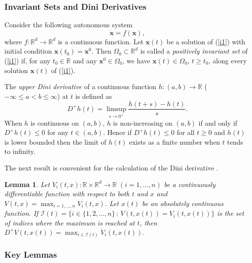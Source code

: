 \documentclass[a4paper, 11pt]{article}
\newtheorem{lemma}{Lemma}
\begin{document}
\subsubsection{Invariant Sets and Dini Derivatives}
Consider the following
autonomous system
\begin{equation}
\label{i1} \dot{\mathbf{x}}=f(\mathbf{x}),
\end{equation}
where $f:\mathbb{R}^d\rightarrow \mathbb{R}^d$ is a  continuous function. Let $\mathbf{x}(t)$ be a solution of
(\ref{i1}) with initial condition $\mathbf{x}(t_0)=\mathbf{x}^0$. Then $\Omega_0\subset \mathbb{R}^d$ is called a {\it positively invariant
set} of (\ref{i1}) if, for any $t_0\in\mathbb{R}$ and any $\mathbf{x}^0\in\Omega_0$,
we have $\mathbf{x}(t)\in\Omega_0$, $t\geq t_0$, along  every solution $\mathbf{x}(t)$ of (\ref{i1}).

The  {\it upper Dini
derivative} of a continuous function $h: (a,b)\to \mathbb{R}$ ($-\infty\leq a<b\leq \infty$) at $t$ is defined as
$$
D^+h(t)=\limsup_{s\to 0^+} \frac{h(t+s)-h(t)}{s}.
$$
When $h$ is continuous on $(a,b)$, $h$ is
non-increasing on $(a,b)$ if and only if $ D^+h(t)\leq 0$ for any
$t\in (a,b)$. Hence if $ D^+h(t)\leq 0$ for all $t\geq 0$ and $h(t)$ is lower bounded then the limit of $h(t)$ exists as a finite number when $t$ tends to infinity.

The next
result is convenient for the calculation of the Dini derivative \cite{dan}.

\begin{lemma}
\label{lemdini}  Let $V_i(t,x): \mathbb{R}\times \mathbb{R}^d \to \mathbb{R}\;(i=1,\dots,n)$ be
 a continuously differentiable  function with respect to both $t$ and $x$  and $V(t,x)=\max_{i=1,\dots,n}V_i(t,x)$. Let $x(t)$ be an absolutely continuous function. If $
\mathcal{I}(t)=\{i\in \{1,2,\dots,n\}\,:\,V(t,x(t))=V_i(t,x(t))\}$
is the set of indices where the maximum is reached at $t$, then
$
D^+V(t,x(t))=\max_{i\in\mathcal{ I}(t)}\dot{V}_i(t,x(t)).
$
\end{lemma}


\subsubsection{Key Lemmas}
\end{document}
